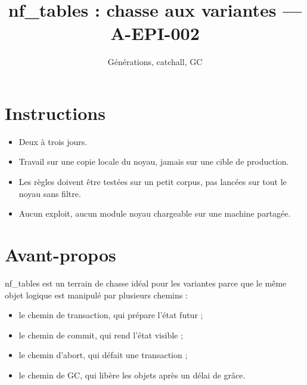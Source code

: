 \documentclass{training}
\begin{document}
\title{nf\_tables : chasse aux variantes --- A-EPI-002}
\subtitle{Générations, catchall, GC}
\maketitle

\newpage
\tableofcontents
\newpage

\chapter{Instructions}
\begin{itemize}
  \item Deux à trois jours.
  \item Travail sur une copie locale du noyau, jamais sur une cible de
        production.
  \item Les règles doivent être testées sur un petit corpus, pas lancées
        sur tout le noyau sans filtre.
  \item Aucun exploit, aucun module noyau chargeable sur une machine
        partagée.
\end{itemize}





\chapter{Avant-propos}

nf\_tables est un terrain de chasse idéal pour les variantes parce que le
même objet logique est manipulé par plusieurs chemins :

\begin{itemize}
  \item le chemin de transaction, qui prépare l'état futur ;
  \item le chemin de commit, qui rend l'état visible ;
  \item le chemin d'abort, qui défait une transaction ;
  \item le chemin de GC, qui libère les objets après un délai de grâce.
\end{itemize}
\end{document}
